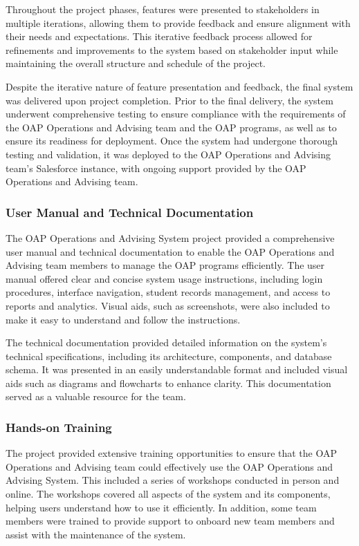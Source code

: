\documentclass[12pt]{article}
\begin{document}
Throughout the project phases, features were presented to stakeholders in multiple iterations, allowing them to provide feedback and ensure alignment with their needs and expectations. This iterative feedback process allowed for refinements and improvements to the system based on stakeholder input while maintaining the overall structure and schedule of the project.

Despite the iterative nature of feature presentation and feedback, the final system was delivered upon project completion. Prior to the final delivery, the system underwent comprehensive testing to ensure compliance with the requirements of the OAP Operations and Advising team and the OAP programs, as well as to ensure its readiness for deployment. Once the system had undergone thorough testing and validation, it was deployed to the OAP Operations and Advising team's Salesforce instance, with ongoing support provided by the OAP Operations and Advising team.

\subsubsection{User Manual and Technical Documentation}
The OAP Operations and Advising System project provided a comprehensive user manual and technical documentation to enable the OAP Operations and Advising team members to manage the OAP programs efficiently. The user manual offered clear and concise system usage instructions, including login procedures, interface navigation, student records management, and access to reports and analytics. Visual aids, such as screenshots, were also included to make it easy to understand and follow the instructions.

The technical documentation provided detailed information on the system's technical specifications, including its architecture, components, and database schema. It was presented in an easily understandable format and included visual aids such as diagrams and flowcharts to enhance clarity. This documentation served as a valuable resource for the team.

\subsubsection{Hands-on Training}
The project provided extensive training opportunities to ensure that the OAP Operations and Advising team could effectively use the OAP Operations and Advising System. This included a series of workshops conducted in person and online. The workshops covered all aspects of the system and its components, helping users understand how to use it efficiently. In addition, some team members were trained to provide support to onboard new team members and assist with the maintenance of the system.
\end{document}
